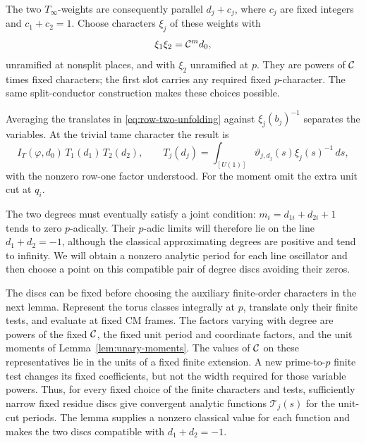 The two $T_\infty$-weights are consequently parallel $d_j+c_j$, where
$c_j$ are fixed integers and $c_1+c_2=1$.  Choose characters $\xi_j$ of
these weights with
\begin{equation}\label{eq:unary-character-product}
 \xi_1\xi_2=\mathcal C^m d_0,
\end{equation}
unramified at nonsplit places, and with $\xi_2$ unramified at $p$.
They are powers of $\mathcal C$ times fixed characters; the first slot carries
any required fixed $p$-character.  The same split-conductor construction
makes these choices possible.

Averaging the translates in \eqref{eq:row-two-unfolding} against
$\xi_j(b_j)^{-1}$ separates the variables.  At the trivial tame
character the result is
\begin{equation}\label{eq:unary-period-factorization}
 I_T(\varphi,d_0)\,T_1(d_1)\,T_2(d_2),\qquad
 T_j(d_j)=\int_{[U(1)]}\vartheta_{j,d_j}(s)\xi_j(s)^{-1}\,ds,
\end{equation}
with the nonzero row-one factor understood.  For the moment omit the
extra unit cut at $q_i$.

The two degrees must eventually satisfy a joint condition:
$m_i=d_{1i}+d_{2i}+1$ tends to zero $p$-adically.  Their $p$-adic
limits will therefore lie on the line $d_1+d_2=-1$, although the
classical approximating degrees are positive and tend to infinity.
We will obtain a nonzero analytic period for each line oscillator and
then choose a point on this compatible pair of degree discs avoiding
their zeros.

The discs can be fixed before choosing the auxiliary finite-order
characters in the next lemma.  Represent the torus classes integrally
at $p$, translate only their finite tests, and evaluate at fixed CM
frames.  The factors varying with degree are powers of the fixed
$\mathcal C$, the fixed unit period and coordinate factors, and the unit
moments of Lemma~\ref{lem:unary-moments}.  The values of $\mathcal C$ on
these representatives lie in the units of a fixed finite extension.
A new prime-to-$p$ finite test changes its fixed coefficients, but not
the width required for those variable powers.  Thus, for every fixed
choice of the finite characters and tests, sufficiently narrow fixed
residue discs give convergent analytic functions $\mathcal T_j(s)$
for the unit-cut periods.  The lemma supplies a nonzero classical
value for each function and makes the two discs compatible with
$d_1+d_2=-1$.

